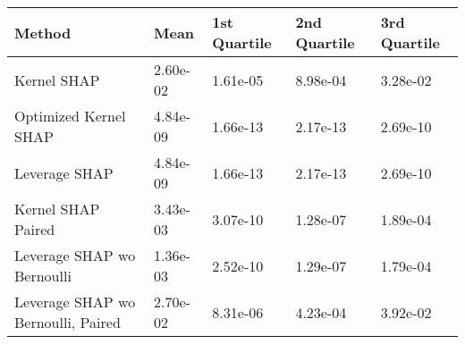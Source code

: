 \begin{tabular}{lllll}
  \toprule
  \textbf{Method} & \textbf{Mean} & \textbf{1st Quartile} & \textbf{2nd Quartile} & \textbf{3rd Quartile} \\ \midrule 
Kernel SHAP & 2.60e-02 & 1.61e-05 & 8.98e-04 & 3.28e-02\\
Optimized Kernel SHAP & \cellcolor{gold!60}4.84e-09 & \cellcolor{gold!60}1.66e-13 & \cellcolor{gold!60}2.17e-13 & \cellcolor{gold!60}2.69e-10\\
Leverage SHAP & \cellcolor{gold!60}4.84e-09 & \cellcolor{gold!60}1.66e-13 & \cellcolor{gold!60}2.17e-13 & \cellcolor{gold!60}2.69e-10\\
Kernel SHAP Paired & 3.43e-03 & 3.07e-10 & \cellcolor{bronze!60}1.28e-07 & 1.89e-04\\
Leverage SHAP wo Bernoulli & \cellcolor{bronze!60}1.36e-03 & \cellcolor{bronze!60}2.52e-10 & 1.29e-07 & \cellcolor{bronze!60}1.79e-04\\
Leverage SHAP wo Bernoulli, Paired & 2.70e-02 & 8.31e-06 & 4.23e-04 & 3.92e-02\\
\bottomrule
\end{tabular}